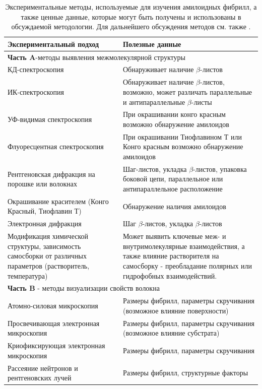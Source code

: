     
\begin{table}[H]
    \centering
    \begin{tabularx}{\textwidth}{|X|X|}
        \textbf{Экспериментальный подход} & \textbf{Полезные данные} \\
\hline
        \multicolumn{2}{l|}{\textbf{Часть A}-методы выявления межмолекулярной структуры} \\
\hline
        КД-спектроскопия & Обнаруживает наличие $\beta$-листов \\
\hline
        ИК-спектроскопия & Обнаруживает наличие $\beta$-листов, возможно, может различать параллельные и антипараллельные $\beta$-листы \\
\hline
        УФ-видимая спектроскопия & При окрашивании конго красным возможно обнаружение амилоидов \\
\hline
        Флуоресцентная спектроскопия & При окрашивании Тиофлавином Т или Конго красным возможно обнаружение амилоидов \\
\hline
        Рентгеновская дифракция на порошке или волокнах & Шаг-листов, укладка $\beta$-листов, упаковка боковой цепи, параллельное или антипараллельное расположение \\
\hline
        Окрашивание красителем (Конго Красный, Тиофлавин Т) & Обнаружение наличия амилоидов \\
\hline
        Электронная дифракция & Шаг $\beta$-листов, укладка $\beta$-листов \\
\hline
        Модификация химической структуры, зависимость самосборки от различных параметров (растворитель, температура) & Может выявить ключевые меж- и внутримолекулярные взаимодействия, а также влияние растворителя на самосборку - преобладание полярных или гидрофобных взаимодействий. \\
\hline
       \multicolumn{2}{l|}{\textbf{Часть B} - методы визуализации свойств волокна}\\
\hline
        Атомно-силовая микроскопия & Размеры фибрилл, параметры скручивания (возможное влияние поверхности) \\
\hline
        Просвечивающая электронная микроскопия & Размеры фибрилл, параметры скручивания (возможное влияние субстрата) \\
\hline
        Криофиксирующая электронная микроскопия & Размеры фибрилл, параметры скручивания \\
\hline
    Рассеяние нейтронов и рентгеновских лучей & Размеры фибрилл, структурные факторы \\
\hline
    \end{tabularx}
    \caption{Экспериментальные методы, используемые для изучения амилоидных фибрилл, а также ценные данные, которые могут быть получены и использованы в обсуждаемой методологии. Для дальнейшего обсуждения методов см. также \cite{sigurdsson_amyloid_2005}.}
    \label{tab:p4_t3}
\end{table}

